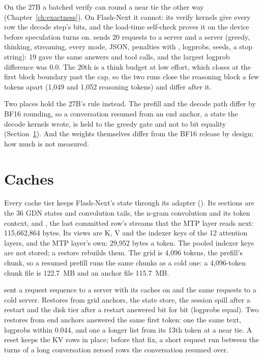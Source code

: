 On the 27B a batched verify can round a near tie the other way (Chapter~\ref{ch:exactness}). On Flash-Next it cannot: its verify kernels give every row the decode step's bits, and the load-time self-check proves it on the device before speculation turns on.  sends 20 requests to a  server and a  server (greedy, thinking, streaming, every  mode, JSON, penalties with , logprobs, seeds, a stop string): 19 gave the same answers and tool calls, and the largest logprob difference was 0.0. The 20th is a think budget at low effort, which closes at the first block boundary past the cap, so the two runs close the reasoning block a few tokens apart (1,049 and 1,052 reasoning tokens) and differ after it.

Two places hold the 27B's rule instead. The prefill and the decode path differ by BF16 rounding, so a conversation resumed from an end anchor, a state the decode kernels wrote, is held to the greedy gate and not to bit equality (Section~\ref{sec:fn-caches}). And the weights themselves differ from the BF16 release by design; how much is not measured.

\section{Caches}\label{sec:fn-caches}

Every cache tier keeps Flash-Next's state through its adapter (). Its sections are the 36 GDN states and convolution tails, the n-gram convolution and its token context, and , the last committed row's streams that the MTP layer reads next: 115,662,864 bytes. Its views are K, V and the indexer keys of the 12 attention layers, and the MTP layer's own: 29,952 bytes a token. The pooled indexer keys are not stored; a restore rebuilds them. The grid is 4,096 tokens, the prefill's chunk, so a resumed prefill runs the same chunks as a cold one: a 4,096-token chunk file is 122.7~MB and an anchor file 115.7~MB.

 sent a request sequence to a server with its caches on and the same requests to a cold server. Restores from grid anchors, the state store, the session spill after a restart and the disk tier after a restart answered bit for bit (logprobs equal). Two restores from end anchors answered the same first token: one the same text, logprobs within 0.044, and one a longer list from its 13th token at a near tie. A reset keeps the KV rows in place; before that fix, a short request run between the turns of a long conversation zeroed rows the conversation resumed over.

